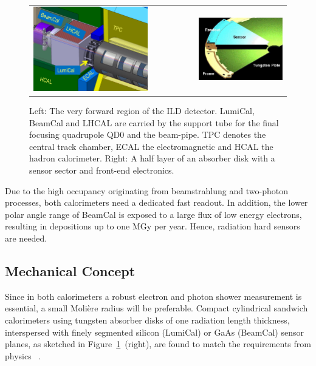 \begin{figure}[htpb]
\begin{center}
 \begin{tabular}{rrr}
   \includegraphics[width=0.45\columnwidth]{Calorimeter/FCAL/figs/forward_region_new}
    &~~~~~~~~&
   \includegraphics[width=0.45\columnwidth]{Calorimeter/FCAL/figs/BClayer}
   \end{tabular}
  \end{center}
\caption{Left: The very forward region of the ILD detector.
LumiCal, BeamCal and LHCAL are carried by
the support tube for the final focusing quadrupole QD0 and the beam-pipe.
TPC denotes the central track chamber, ECAL the electromagnetic and
HCAL the hadron calorimeter.
Right: A half layer of an absorber disk with a sensor sector and front-end electronics.
}
\label{fig:Forward_structure}
\end{figure}
Due to the high occupancy originating from beamstrahlung and two-photon processes,
both calorimeters need a dedicated fast readout.
In addition, the lower polar angle range of BeamCal is exposed to a large flux
of low energy electrons, resulting in depositions up to one
MGy per year. Hence, radiation hard sensors are needed.



\subsection{Mechanical Concept}
Since in both calorimeters a robust electron and photon shower measurement
is essential, a small Moli\`{e}re radius will be preferable.
Compact
cylindrical sandwich
calorimeters using tungsten absorber disks of one radiation length thickness, interspersed with
finely segmented silicon (LumiCal) or GaAs (BeamCal) sensor planes, as sketched in
Figure~\ref{fig:Forward_structure}~(right),
are found
to match the requirements from physics~\cite{2010JInst...512002A} .


